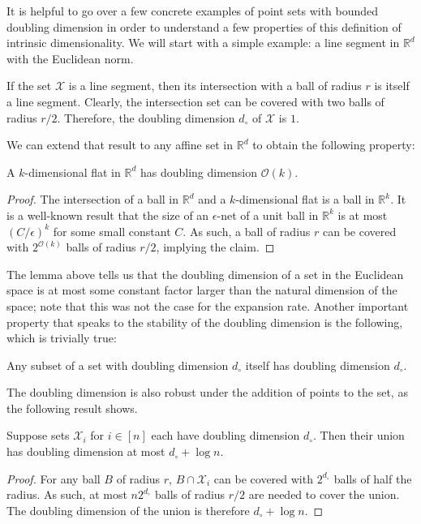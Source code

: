 It is helpful to go over a few concrete examples of point sets with bounded
doubling dimension in order to understand a few properties of this definition of
intrinsic dimensionality.
We will start with a simple example: a line segment in $\mathbb{R}^d$ with the Euclidean
norm.

If the set
$\mathcal{X}$ is a line segment, then its intersection with a ball of radius $r$
is itself a line segment. Clearly, the intersection set can be covered with two
balls of radius $r/2$. Therefore, the doubling dimension $d_\circ$ of $\mathcal{X}$
is $1$.

We can extend that result to any affine set in $\mathbb{R}^d$ to obtain the following
property:

\begin{lemma}
    \label{lemma:intrinsic-dimensionality:k-dimensional-flat}
    A $k$-dimensional flat in $\mathbb{R}^d$ has doubling dimension $\mathcal{O}(k)$.
\end{lemma}
\begin{proof}
    The intersection of a ball in $\mathbb{R}^d$ and a $k$-dimensional flat is a ball in
    $\mathbb{R}^k$.
    It is a well-known result that the size of an $\epsilon$-net of a 
    unit ball in $\mathbb{R}^k$ is at most $(C/\epsilon)^k$ for some small
    constant $C$. As such, a ball of radius $r$ can be covered with $2^{\mathcal{O}(k)}$
    balls of radius $r/2$, implying the claim.
\end{proof}

The lemma above tells us that the doubling dimension of a set in the Euclidean space
is at most some constant factor larger than the natural dimension of the space;
note that this was not the case for the expansion rate.
Another important property that speaks to the stability of the doubling dimension
is the following, which is trivially true:

\begin{lemma}
    Any subset of a set with doubling dimension $d_\circ$ itself has doubling dimension $d_\circ$.
\end{lemma}

The doubling dimension is also robust under the addition of points to the set,
as the following result shows.

\begin{lemma}
    \label{lemma:intrinsic-dimensionality:union}
    Suppose sets $\mathcal{X}_i$ for $i \in [n]$ each have doubling dimension $d_\circ$.
    Then their union has doubling dimension at most $d_\circ + \log n$.
\end{lemma}
\begin{proof}
    For any ball $B$ of radius $r$, $B \cap \mathcal{X}_i$ can be covered with
    $2^{d_\circ}$ balls of half the radius. As such, at most $n2^{d_\circ}$ balls
    of radius $r/2$ are needed to cover the union. The doubling dimension of the union
    is therefore $d_\circ + \log n$.
\end{proof}

